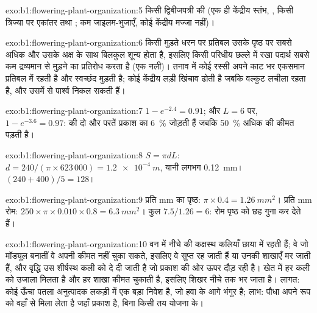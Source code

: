 \begin{solution}{exo:b1:flowering-plant-organization:5}
किसी द्विबीजपत्री की  (एक ही केंद्रीय स्तंभ, , किसी त्रिज्या
पर एकांतर  तथा ; कम जाइलम-भुजाएँ, कोई केंद्रीय मज्जा नहीं)।
\end{solution}

\begin{solution}{exo:b1:flowering-plant-organization:6}
किसी मुड़ते धरन पर प्रतिबल उसके पृष्ठ पर सबसे अधिक और उसके अक्ष के साथ
बिलकुल शून्य होता है, इसलिए किसी परिधीय छल्ले में रखा पदार्थ सबसे कम
द्रव्यमान से मुड़ने का प्रतिरोध करता है (एक नली)। तनाव में कोई रस्सी अपने
काट भर एकसमान प्रतिबल में रहती है और स्वच्छंद मुड़ती है; कोई केंद्रीय
लड़ी खिंचाव ढोती है जबकि वल्कुट लचीला रहता है, और उसमें से पार्श्व 
निकल सकती हैं।
\end{solution}

\begin{solution}{exo:b1:flowering-plant-organization:7}
$1 - e^{-2.4} = 0.91$; और $L = 6$ पर, $1 - e^{-3.6} = 0.97$:  की दो
और परतें प्रकाश का \qty{6}{\%} जोड़ती हैं जबकि \qty{50}{\%}
अधिक  की कीमत पड़ती है।
\end{solution}

\begin{solution}{exo:b1:flowering-plant-organization:8}
$S = \pi d L$: $d = 240/(\pi\times 623\,000) = \qty{1.2e-4}{m}$, यानी
लगभग \qty{0.12}{mm}। $(240 + 400)/5 = 128$।
\end{solution}

\begin{solution}{exo:b1:flowering-plant-organization:9}
प्रति mm  का पृष्ठ: $\pi\times 0.4 = \qty{1.26}{mm^2}$। प्रति mm रोम:
$250\times\pi\times 0.010\times 0.8 = \qty{6.3}{mm^2}$। कुल
$7.5/1.26 = 6$: रोम पृष्ठ को छह गुना कर देते हैं।
\end{solution}

\begin{solution}{exo:b1:flowering-plant-organization:10}
वन में नीचे की कक्षस्थ कलियाँ छाया में रहती हैं; वे जो मॉड्यूल बनातीं वे
अपनी कीमत नहीं चुका सकते, इसलिए वे सुप्त रह जाती हैं या उनकी शाखाएँ मर
जाती हैं, और वृद्धि उस शीर्षस्थ कली को दे दी जाती है जो प्रकाश की ओर ऊपर
दौड़ रही है। खेत में हर कली को उजाला मिलता है और हर शाखा कीमत चुकाती है,
इसलिए शिखर नीचे तक भर जाता है। लागत: कोई ऊँचा पतला  अनुत्पादक लकड़ी
में एक बड़ा निवेश है, जो हवा के आगे भंगुर है; लाभ: पौधा अपने रूप को वहाँ
से मिला लेता है जहाँ प्रकाश है, बिना किसी तय योजना के।
\end{solution}


